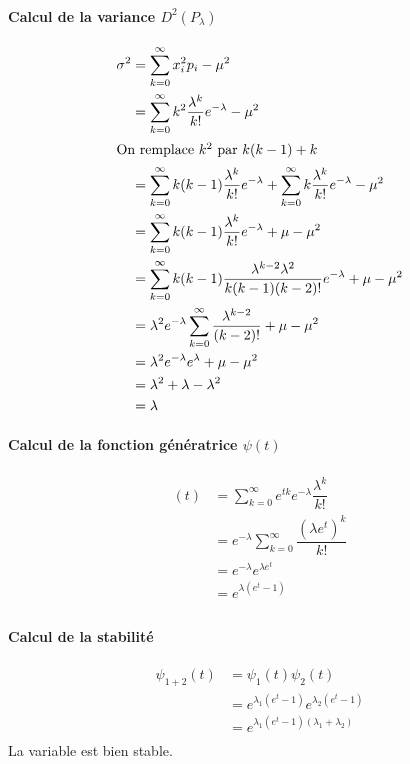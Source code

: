 \paragraph{Calcul de la variance $D^2(P_\lambda)$}
\begin{align*}
\sigma^2&=\displaystyle\sum_{k=0}^{\infty}x_i^2p_i-\mu^2\\
&=\displaystyle\sum_{k=0}^{\infty}k^2\dfrac{\lambda^k}{k!}e^{-\lambda}-\mu^2\\
\intertext{On remplace $k^2$ par $k(k-1)+k$}
&=\displaystyle\sum_{k=0}^{\infty}k(k-1)\dfrac{\lambda^k}{k!}e^{-\lambda}+\sum_{k=0}^{\infty}k\dfrac{\lambda^k}{k!}e^{-\lambda}-\mu^2\\
&=\displaystyle\sum_{k=0}^{\infty}k(k-1)\dfrac{\lambda^k}{k!}e^{-\lambda}+\mu-\mu^2\\
&=\displaystyle\sum_{k=0}^{\infty}k(k-1)\dfrac{\lambda^{k-2}\lambda^2}{k(k-1)(k-2)!}e^{-\lambda}+\mu-\mu^2\\
&=\displaystyle\lambda^2e^{-\lambda}\sum_{k=0}^{\infty}\dfrac{\lambda^{k-2}}{(k-2)!}+\mu-\mu^2\\
&=\displaystyle\lambda^2e^{-\lambda}e^\lambda+\mu-\mu^2\\
&=\displaystyle\lambda^2+\lambda-\lambda^2\\
&=\lambda
\end{align*}



\paragraph{Calcul de la fonction génératrice $\psi(t)$}
\begin{align*}
(t)&=\displaystyle\sum_{k=0}^{\infty}e^{tk}e^{-\lambda}\dfrac{\lambda^k}{k!}\\
&=e^{-\lambda}\sum_{k=0}^{\infty}\dfrac{(\lambda e^t)^k}{k!}\\
&=e^{-\lambda}e^{\lambda e^t}\\
&=e^{\lambda(e^t-1)}\\
\end{align*}



\paragraph{Calcul de la stabilité}
\begin{align*}
\psi_{1+2}(t)&=\psi_1(t)\psi_2(t)\\
&=e^{\lambda_1(e^t-1)}e^{\lambda_2(e^t-1)}\\
&=e^{\lambda_1(e^t-1)(\lambda_1+\lambda_2)}\\
\end{align*}
La variable est bien stable.






